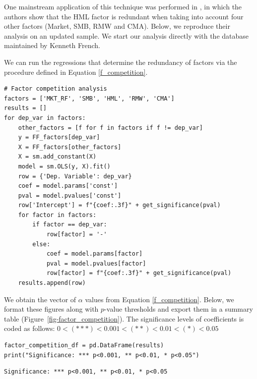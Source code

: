 One mainstream application of this technique was performed in \cite{fama2015five}, in which the authors show that the HML factor is redundant when taking into account four other factors (Market, SMB, RMW and CMA). Below, we reproduce their analysis on an updated sample. We start our analysis directly with the database maintained by Kenneth French.

We can run the regressions that determine the redundancy of factors via the procedure defined in Equation \ref{f_competition}.

\begin{verbatim}
# Factor competition analysis
factors = ['MKT_RF', 'SMB', 'HML', 'RMW', 'CMA']
results = []
for dep_var in factors:
    other_factors = [f for f in factors if f != dep_var]
    y = FF_factors[dep_var]
    X = FF_factors[other_factors]
    X = sm.add_constant(X)
    model = sm.OLS(y, X).fit()
    row = {'Dep. Variable': dep_var}
    coef = model.params['const']
    pval = model.pvalues['const']
    row['Intercept'] = f"{coef:.3f}" + get_significance(pval)
    for factor in factors:
        if factor == dep_var:
            row[factor] = '-'
        else:
            coef = model.params[factor]
            pval = model.pvalues[factor]
            row[factor] = f"{coef:.3f}" + get_significance(pval)
    results.append(row)
\end{verbatim}

We obtain the vector of $\alpha$ values from Equation \ref{f_competition}. Below, we format these figures along with $p$-value thresholds and export them in a summary table (Figure~\ref{fig-factor_competition}). The significance levels of coefficients is coded as follows: $0<(***)<0.001<(**)<0.01<(*)<0.05$

\begin{verbatim}
factor_competition_df = pd.DataFrame(results)
print("Significance: *** p<0.001, ** p<0.01, * p<0.05")
\end{verbatim}

\begin{verbatim}
Significance: *** p<0.001, ** p<0.01, * p<0.05
\end{verbatim}

